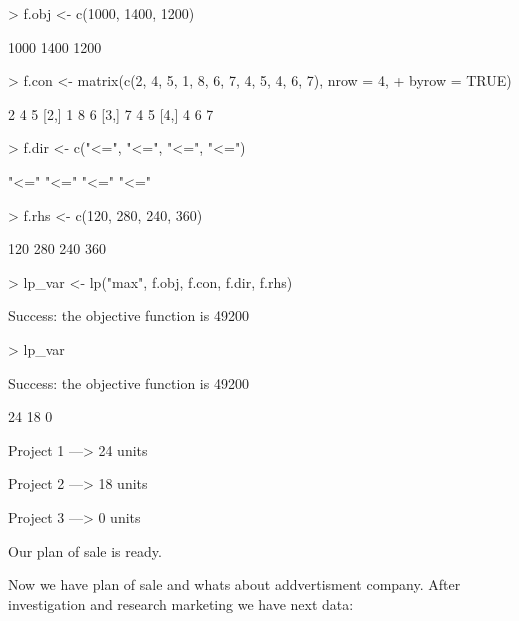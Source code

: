 \documentclass[a4paper,11pt]{scrartcl}
\begin{document}
\begin{Schunk}
\begin{Sinput}
> f.obj <- c(1000, 1400, 1200)
\end{Sinput}
\begin{Soutput}
[1] 1000 1400 1200
\end{Soutput}
\begin{Sinput}
> f.con <- matrix(c(2, 4, 5, 1, 8, 6, 7, 4, 5, 4, 6, 7), nrow = 4, 
+     byrow = TRUE)
\end{Sinput}
\begin{Soutput}
     [,1] [,2] [,3]
[1,]    2    4    5
[2,]    1    8    6
[3,]    7    4    5
[4,]    4    6    7
\end{Soutput}
\begin{Sinput}
> f.dir <- c("<=", "<=", "<=", "<=")
\end{Sinput}
\begin{Soutput}
[1] "<=" "<=" "<=" "<="
\end{Soutput}
\begin{Sinput}
> f.rhs <- c(120, 280, 240, 360)
\end{Sinput}
\begin{Soutput}
[1] 120 280 240 360
\end{Soutput}
\begin{Sinput}
> lp_var <- lp("max", f.obj, f.con, f.dir, f.rhs)
\end{Sinput}
\begin{Soutput}
Success: the objective function is 49200 
\end{Soutput}
\begin{Sinput}
> lp_var
\end{Sinput}
\begin{Soutput}
Success: the objective function is 49200 
\end{Soutput}
\begin{Soutput}
[1] 24 18  0
\end{Soutput}
\end{Schunk}
Project 1 ---> 24 units

Project 2 ---> 18 units

Project 3 ---> 0 units

Our plan of sale  is ready.
\bigskip

Now we have plan of sale and whats about addvertisment company.
After investigation  and research marketing  we  have   next data: 
\end{document}
